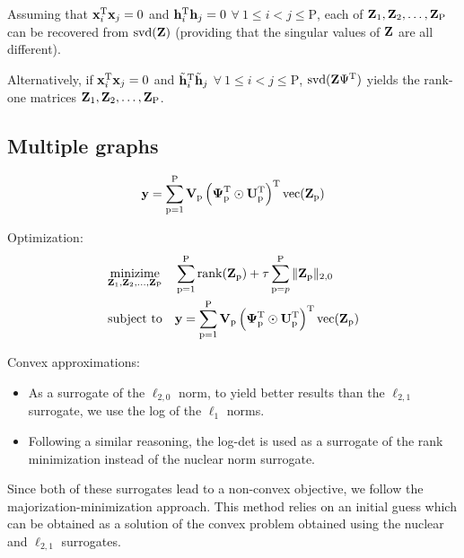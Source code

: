 \documentclass{article}
\newcommand{\numSources}{\text{P}}
\newcommand{\sourceIndex}{\text{p}}
\DeclareMathOperator{\vect}{vec}
\DeclareMathOperator{\rank}{rank}
\DeclareMathOperator{\svd}{svd}
\begin{document}
Assuming that ${\mathbf x}_{i}^{{\text{T}}} {\mathbf x}_{j} = 0$ and ${\mathbf h}_{i}^{{\text{T}}} {\mathbf h}_{j} = 0$ $\forall \ 1 \leqslant i < j \leqslant \numSources$, each of $\bbZ_{1},\bbZ_{2},\ldots,\bbZ_{\numSources}$ can be recovered from $\svd(\bbZ)$ (providing that the singular values of ${\mathbf Z}$ are all different).

Alternatively, if ${\mathbf x}_{i}^{{\text{T}}} {\mathbf x}_{j} = 0$ and $\tilde {{\mathbf h}}_{i}^{{\text{T}}} \tilde {{\mathbf h}}_{j}$ $\forall \ 1 \leqslant i < j \leqslant \numSources$, $\svd(\bbZ \Psi^{\rmT})$ yields the rank-one matrices $\bbZ_{1},\bbZ_{2},\ldots,\bbZ_{\numSources}$.

\subsection*{Multiple graphs}

\begin{equation}
  \bby = \sum_{\sourceIndex=1}^{\numSources} \bbV_{\sourceIndex} \left(\bbPsi_{\sourceIndex}^{\rmT} \odot \bbU_{\sourceIndex}^{\rmT} \right)^{\rmT} \vect(\bbZ_{\sourceIndex})
\end{equation}

Optimization:
\begin{align}
  \mathop{\text{minizime}}_{\bbZ_{1},\bbZ_{2},\ldots,\bbZ_{\numSources}} \quad & \sum_{\sourceIndex=1}^{\numSources} \rank(\bbZ_{\sourceIndex}) + \tau \sum_{\sourceIndex=p}^{\numSources} \|\bbZ_{\sourceIndex}\|_{2,0} \\
  \text{subject to} \quad & \bby = \sum_{\sourceIndex=1}^{\numSources} \bbV_{\sourceIndex} \left(\bbPsi_{\sourceIndex}^{\rmT} \odot \bbU_{\sourceIndex}^{\rmT} \right)^{\rmT} \vect(\bbZ_{\sourceIndex}) \nonumber
\end{align}

Convex approximations:
\begin{itemize}
  \item As a surrogate of the $\ell_{2,0}$ norm, to yield better results than the $\ell_{2,1}$ surrogate, we use the log of the $\ell_{1}$ norms.
  \item Following a similar reasoning, the log-det is used as a surrogate of the rank minimization instead of the nuclear norm surrogate.
\end{itemize}

Since both of these surrogates lead to a non-convex objective, we follow the majorization-minimization approach. This method relies on an initial guess which can be obtained as a solution of the convex problem obtained using the nuclear and $\ell_{2,1}$ surrogates.
\end{document}
